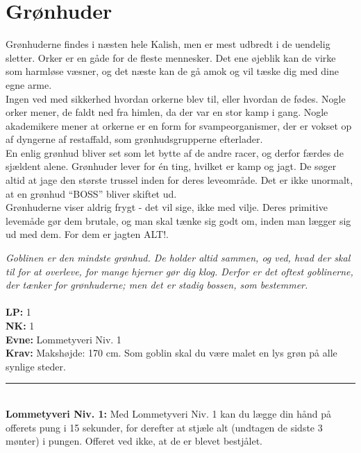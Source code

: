 \section{Grønhuder}
Grønhuderne findes i næsten hele Kalish, men er mest udbredt i de uendelig sletter. Orker er en gåde for de fleste mennesker. Det ene øjeblik kan de virke som harmløse væsner, og det næste kan de gå amok og vil tæske dig med dine egne arme.\\
Ingen ved med sikkerhed hvordan orkerne blev til, eller hvordan de fødes. Nogle orker mener, de faldt ned fra himlen, da der var en stor kamp i gang. Nogle akademikere mener at orkerne er en form for svampeorganismer, der er vokset op af dyngerne af restaffald, som grønhudsgrupperne efterlader.\\
En enlig grønhud bliver set som let bytte af de andre racer, og derfor færdes de sjældent alene. Grønhuder lever for én ting, hvilket er kamp og jagt. De søger altid at jage den største trussel inden for deres leveområde. Det er ikke unormalt, at en grønhud “BOSS” bliver skiftet ud.\\
Grønhuderne viser aldrig frygt - det vil sige, ikke med vilje. Deres primitive levemåde gør dem brutale, og man skal tænke sig godt om, inden man lægger sig ud med dem. For dem er jagten ALT!.
\begin{race*}[Gobliner]
\textit{Goblinen er den mindste grønhud. De holder altid sammen, og ved, hvad der skal til for at overleve, for mange hjerner gør dig klog. Derfor er det oftest goblinerne, der tænker for grønhuderne; men det er stadig bossen, som bestemmer.}\\
\\
\textbf{LP:} 1\\ 
\textbf{NK:} 1\\ 
\textbf{Evne:} Lommetyveri Niv. 1\\
\textbf{Krav:} Makshøjde: 170 cm. Som goblin skal du være malet en lys grøn på alle synlige steder.\\
\rule{\textwidth}{0.4pt}\\
\textbf{Lommetyveri Niv. 1:} Med Lommetyveri Niv. 1 kan du lægge din hånd på offerets pung i 15 sekunder, for derefter at stjæle alt (undtagen de sidste 3 mønter) i pungen. Offeret ved ikke, at de er blevet bestjålet.\\
\end{race*}

